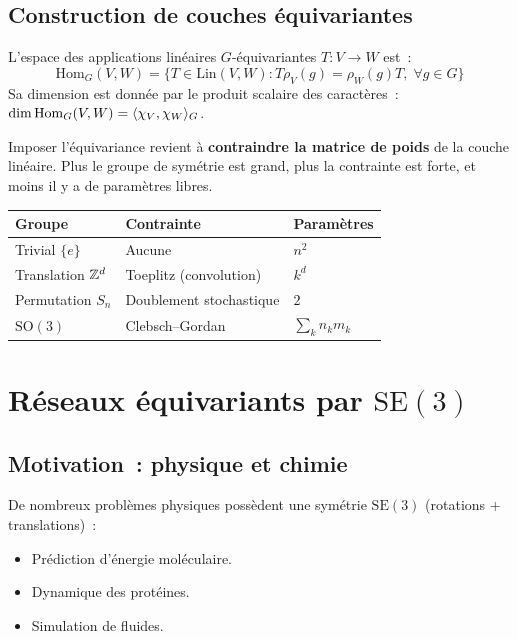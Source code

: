 \subsection{Construction de couches \'equivariantes}

\begin{theoreme}
L'espace des applications lin\'eaires $G$-\'equivariantes $T: V \to W$ est~:
\[
    \mathrm{Hom}_G(V, W) = \{T \in \mathrm{Lin}(V, W) :
    T \rho_V(g) = \rho_W(g) T,\; \forall g \in G\}
\]
Sa dimension est donn\'ee par le produit scalaire des caract\`eres~:
$\dim \mathrm{Hom}_G(V, W) = \langle \chi_V, \chi_W \rangle_G$.
\end{theoreme}

\begin{intuition}[title=\textbf{Contrainte d'\'equivariance $=$ partage de poids}]
Imposer l'\'equivariance revient \`a \textbf{contraindre la matrice de poids}
de la couche lin\'eaire. Plus le groupe de sym\'etrie est grand, plus la
contrainte est forte, et moins il y a de param\`etres libres.
\begin{center}
\begin{tabular}{lll}
\toprule
\textbf{Groupe} & \textbf{Contrainte} & \textbf{Param\`etres} \\
\midrule
Trivial $\{e\}$ & Aucune & $n^2$ \\
Translation $\mathbb{Z}^d$ & Toeplitz (convolution) & $k^d$ \\
Permutation $S_n$ & Doublement stochastique & $2$ \\
$\mathrm{SO}(3)$ & Clebsch--Gordan & $\sum_k n_k m_k$ \\
\bottomrule
\end{tabular}
\end{center}
\end{intuition}

\section{R\'eseaux \'equivariants par $\mathrm{SE}(3)$}

\subsection{Motivation~: physique et chimie}

De nombreux probl\`emes physiques poss\`edent une sym\'etrie $\mathrm{SE}(3)$
(rotations + translations)~:
\begin{itemize}
    \item Pr\'ediction d'\'energie mol\'eculaire.
    \item Dynamique des prot\'eines.
    \item Simulation de fluides.
\end{itemize}

